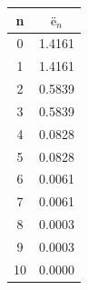 \documentclass{article}
\begin{document}
\begin{tabular}{|c|c|}
\hline
n & $ë_n$} \\
\hline
 0 & 1.4161 \\ 
  1 & 1.4161 \\ 
  2 & 0.5839 \\ 
  3 & 0.5839 \\ 
  4 & 0.0828 \\ 
  5 & 0.0828 \\ 
  6 & 0.0061 \\ 
  7 & 0.0061 \\ 
  8 & 0.0003 \\ 
  9 & 0.0003 \\ 
 10 & 0.0000 \\ 
 \hline 
\end{tabular}
\end{document}
